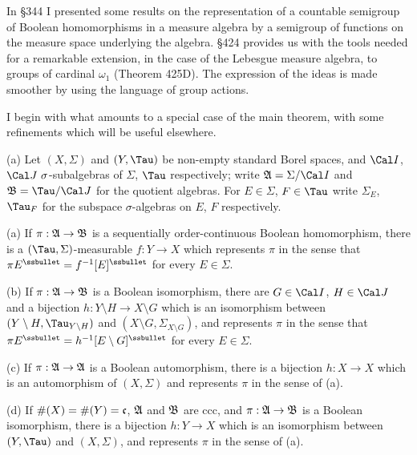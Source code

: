 
\def\chaptername{Descriptive set theory}
\def\sectionname{Realization of automorphisms}


In \S344 I presented some results on the representation of a countable
semigroup of Boolean homomorphisms in a measure algebra by a semigroup of
functions on the measure space underlying the algebra.   \S424 provides us
with the
tools needed for a remarkable extension, in the case of the Lebesgue
measure algebra, to groups of cardinal $\omega_1$
(Theorem 425D).   The expression of the ideas is made smoother by using the
language of group actions.

I begin with what amounts to a special case of the main
theorem, with some refinements which will be useful elsewhere.

\medskip

 (a) Let $(X,\Sigma)$ and $(Y,\Tau)$ be
non-empty standard Borel
spaces, and $\Cal I$, $\Cal J\,\,\sigma$-subalgebras of $\Sigma$, $\Tau$
respectively;  write $\frak A=\Sigma/\Cal I$ and $\frak B=\Tau/\Cal J$ for
the quotient algebras.   For $E\in\Sigma$, $F\in\Tau$ write $\Sigma_E$,
$\Tau_F$ for the subspace $\sigma$-algebras on $E$, $F$ respectively.

(a) If $\pi:\frak A\to\frak B$ is a sequentially order-continuous
Boolean
homomorphism, there is a $(\Tau,\Sigma)$-measurable $f:Y\to X$ which
represents $\pi$ in the sense that
$\pi E^{\ssbullet}=f^{-1}[E]^{\ssbullet}$ for every $E\in\Sigma$.

(b) If $\pi:\frak A\to\frak B$ is a Boolean
isomorphism, there are $G\in\Cal I$, $H\in\Cal J$ and a bijection
$h:Y\setminus H\to X\setminus G$ which is an isomorphism between
$(Y\setminus H,\Tau_{Y\setminus H})$ and
$(X\setminus G,\Sigma_{X\setminus G})$, and represents $\pi$ in the sense that
$\pi E^{\ssbullet}=h^{-1}[E\setminus G]^{\ssbullet}$ for every
$E\in\Sigma$.

(c) If $\pi:\frak A\to\frak A$ is a Boolean automorphism, there is a
bijection $h:X\to X$ which is an
automorphism of $(X,\Sigma)$ and represents $\pi$ in the sense of (a).

(d) If $\#(X)=\#(Y)=\frak c$, $\frak A$ and $\frak B$ are ccc, and
$\pi:\frak A\to\frak B$ is a Boolean isomorphism, there is a bijection
$h:Y\to X$ which is an isomorphism between $(Y,\Tau)$ and $(X,\Sigma)$, and
represents $\pi$ in the sense of (a).

